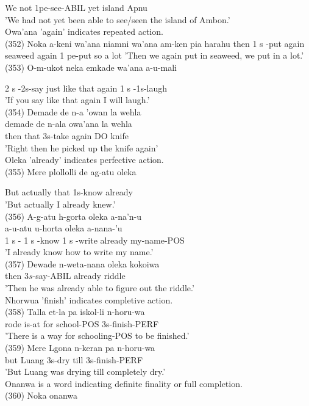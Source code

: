 \documentclass[10pt]{article}
\begin{document}
We not 1pe-see-ABIL yet island Apnu\\
'We had not yet been able to see/seen the island of Ambon.'\\
Owa'ana 'again' indicates repeated action.\\
(352) Noka a-keni wa'ana niamni wa'ana am-ken pia harahu then 1 s -put again seaweed again 1 pe-put so a lot 'Then we again put in seaweed, we put in a lot.'\\
(353) O-m-ukot neka emkade wa'ana a-u-mali

2 s -2s-say just like that again 1 s -1s-laugh\\
'If you say like that again I will laugh.'\\
(354) Demade de n-a 'owan la wehla\\
demade de n-ala owa'ana la wehla\\
then that 3s-take again DO knife\\
'Right then he picked up the knife again'\\
Oleka 'already' indicates perfective action.\\
(355) Mere plollolli de ag-atu oleka

But actually that 1s-know already\\
'But actually I already knew.'\\
(356) A-g-atu h-gorta oleka a-na'n-u\\
a-u-atu u-horta oleka a-nana-'u\\
1 s - 1 s -know 1 s -write already my-name-POS\\
'I already know how to write my name.'\\
(357) Dewade n-weta-nana oleka kokoiwa\\
then \(3 s\)-say-ABIL already riddle\\
'Then he was already able to figure out the riddle.'\\
Nhorwua 'finish' indicates completive action.\\
(358) Talla et-la pa iskol-li n-horu-wa\\
rode is-at for school-POS 3s-finish-PERF\\
'There is a way for schooling-POS to be finished.'\\
(359) Mere Lgona n-keran pa n-horu-wa\\
but Luang 3s-dry till 3s-finish-PERF\\
'But Luang was drying till completely dry.'\\
Onanwa is a word indicating definite finality or full completion.\\
(360) Noka onanwa
\end{document}
